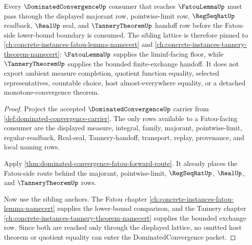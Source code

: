 \begin{theorem}
\label{thm:dominated-convergence-fatou-forward-sibling-lattice}
Every $\DominatedConvergenceUp$ consumer that reaches $\FatouLemmaUp$ must pass through the displayed majorant row, pointwise-limit row, $\RegSeqRatUp$ readback, $\RealUp$ seal, and $\TanneryTheoremUp$ handoff row before the Fatou-side lower-bound boundary is consumed. The sibling lattice is therefore pinned to \autoref{ch:concrete-instances-fatou-lemma-namecert} and \autoref{ch:concrete-instances-tannery-theorem-namecert}: $\FatouLemmaUp$ supplies the liminf-facing floor, while $\TanneryTheoremUp$ supplies the bounded finite-exchange handoff. It does not export ambient measure completion, quotient function equality, selected representatives, countable choice, host almost-everywhere equality, or a detached monotone-convergence theorem.
\end{theorem}
\begin{proof}
Project the accepted $\DominatedConvergenceUp$ carrier from \autoref{def:dominated-convergence-carrier}. The only rows available to a Fatou-facing consumer are the displayed measure, integral, family, majorant, pointwise-limit, regular-readback, Real-seal, Tannery-handoff, transport, replay, provenance, and local naming rows.

Apply \autoref{thm:dominated-convergence-fatou-forward-route}. It already places the Fatou-side route behind the majorant, pointwise-limit, $\RegSeqRatUp$, $\RealUp$, and $\TanneryTheoremUp$ rows.

Now use the sibling anchors. The Fatou chapter \autoref{ch:concrete-instances-fatou-lemma-namecert} supplies the lower-bound comparison, and the Tannery chapter \autoref{ch:concrete-instances-tannery-theorem-namecert} supplies the bounded exchange row. Since both are reached only through the displayed lattice, no omitted host theorem or quotient equality can enter the DominatedConvergence packet.
\end{proof}
